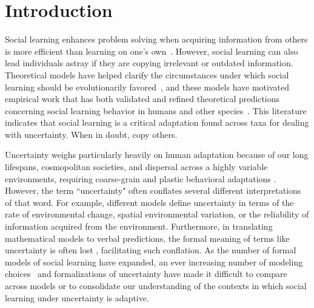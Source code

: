 \documentclass[letterpaper,11.5pt]{scrartcl}
\begin{document}
\section{Introduction}

Social learning enhances problem solving when acquiring information from others is more
efficient than learning on one's own~\cite{Laland2004}. However, social learning can also
lead individuals astray if they are copying irrelevant or outdated information.
Theoretical models have helped clarify the circumstances under which social learning
should be evolutionarily favored~\cite{BoydRicherson1985, aoki2014evolution,Kendal2018}, and these models have motivated empirical work that has both validated and refined theoretical predictions concerning social learning behavior in humans
and other species~\cite{galef2005social,McElreath2005,Kendal2018,Allen2019}.  This literature
indicates that social learning is a critical adaptation found across taxa for dealing
with uncertainty. When in doubt, copy others.  

Uncertainty weighs particularly heavily on human adaptation because of
our long lifespans, cosmopolitan societies, and dispersal across a highly variable environments, requiring coarse-grain and plastic behavioral adaptations \cite{levins1962}. However, the term ``uncertainty"
often conflates several different interpretations of that word. For example, different
models define uncertainty in terms of the rate of environmental change, spatial
environmental variation, or the reliability of information acquired from the environment.
Furthermore, in translating mathematical models to verbal predictions, the formal meaning
of terms like uncertainty is often lost \cite{knight1921, lawson1988probability, volz2012}, facilitating such
conflation. %
As the number of formal models of social learning have expanded, an ever
increasing number of modeling choices~\cite{Kendal2018} and formalizations of
uncertainty have made it difficult to compare across models or to consolidate our
understanding of the contexts in which social learning under uncertainty is adaptive. 
\end{document}
